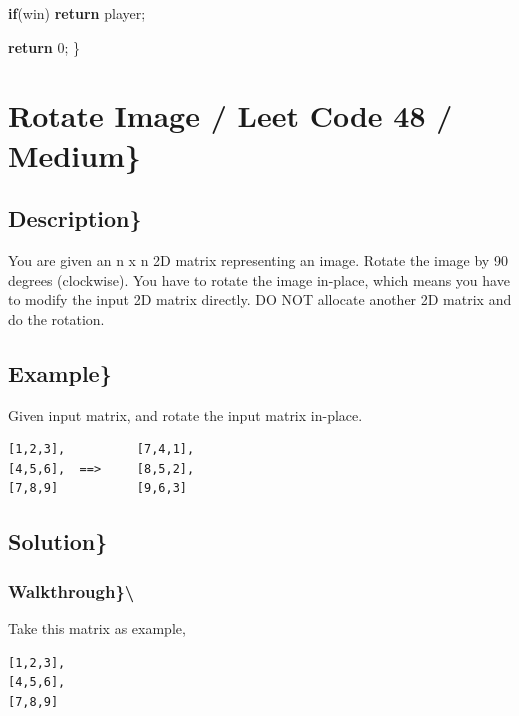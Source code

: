 \documentclass[]{book}
\newenvironment{Shaded}{\begin{snugshade}}{\end{snugshade}}
\newcommand{\DecValTok}[1]{\textcolor[rgb]{0.00,0.00,0.81}{#1}}
\newcommand{\KeywordTok}[1]{\textcolor[rgb]{0.13,0.29,0.53}{\textbf{#1}}}
\newcommand{\NormalTok}[1]{#1}
\begin{document}
\begin{Shaded}
\begin{Highlighting}[]
    \KeywordTok{if}\NormalTok{(win) }\KeywordTok{return}\NormalTok{ player;}

    \KeywordTok{return} \DecValTok{0}\NormalTok{;}
\NormalTok{\}}
\end{Highlighting}
\end{Shaded}

\hypertarget{rotate-image-leet-code-48-medium}{%
\section{Rotate Image / Leet Code 48 / Medium\}}\label{rotate-image-leet-code-48-medium}}

\hypertarget{description-41}{%
\subsection{Description\}}\label{description-41}}

You are given an n x n 2D matrix representing an image. Rotate the image by 90 degrees (clockwise). You have
to rotate the image in-place, which means you have to modify the input 2D matrix directly. DO NOT allocate
another 2D matrix and do the rotation.

\hypertarget{example-40}{%
\subsection{Example\}}\label{example-40}}

Given input matrix, and rotate the input matrix in-place.

\begin{verbatim}
[1,2,3],          [7,4,1],
[4,5,6],  ==>     [8,5,2],
[7,8,9]           [9,6,3]
\end{verbatim}

\hypertarget{solution-33}{%
\subsection{Solution\}}\label{solution-33}}

\hypertarget{walkthrough-42}{%
\subsubsection{Walkthrough\}\textbackslash{}}\label{walkthrough-42}}

Take this matrix as example,

\begin{verbatim}
[1,2,3],
[4,5,6],
[7,8,9]
\end{verbatim}
\end{document}
